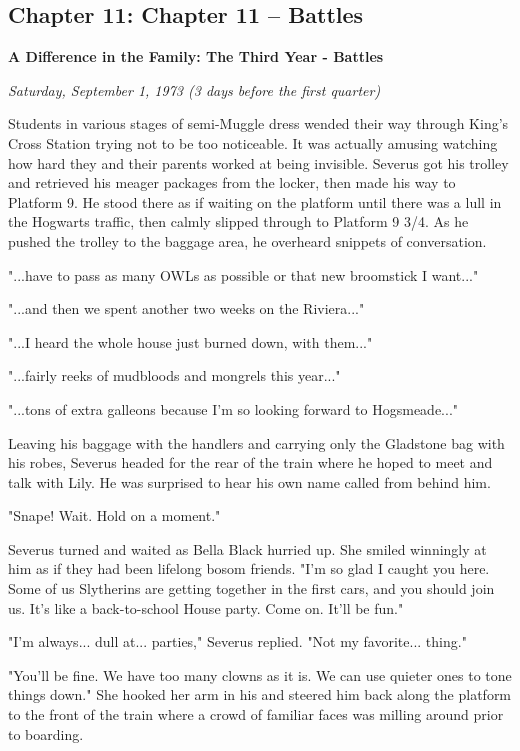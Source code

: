 \documentclass[a4paper,11pt]{article}
\begin{document}
\subsection{Chapter 11: Chapter 11 – Battles}

\textbf{A Difference in the Family: The Third Year - Battles}

\emph{Saturday, September 1, 1973 (3 days before the first quarter)}

Students in various stages of semi-Muggle dress wended their way through King's Cross Station trying not to be too noticeable. It was actually amusing watching how hard they and their parents worked at being invisible. Severus got his trolley and retrieved his meager packages from the locker, then made his way to Platform 9. He stood there as if waiting on the platform until there was a lull in the Hogwarts traffic, then calmly slipped through to Platform 9 3/4. As he pushed the trolley to the baggage area, he overheard snippets of conversation.

"...have to pass as many OWLs as possible or that new broomstick I want..."

"...and then we spent another two weeks on the Riviera..."

"...I heard the whole house just burned down, with them..."

"...fairly reeks of mudbloods and mongrels this year..."

"...tons of extra galleons because I'm so looking forward to Hogsmeade..."

Leaving his baggage with the handlers and carrying only the Gladstone bag with his robes, Severus headed for the rear of the train where he hoped to meet and talk with Lily. He was surprised to hear his own name called from behind him.

"Snape! Wait. Hold on a moment."

Severus turned and waited as Bella Black hurried up. She smiled winningly at him as if they had been lifelong bosom friends. "I'm so glad I caught you here. Some of us Slytherins are getting together in the first cars, and you should join us. It's like a back-to-school House party. Come on. It'll be fun."

"I'm always... dull at... parties," Severus replied. "Not my favorite... thing."

"You'll be fine. We have too many clowns as it is. We can use quieter ones to tone things down." She hooked her arm in his and steered him back along the platform to the front of the train where a crowd of familiar faces was milling around prior to boarding.
\end{document}
